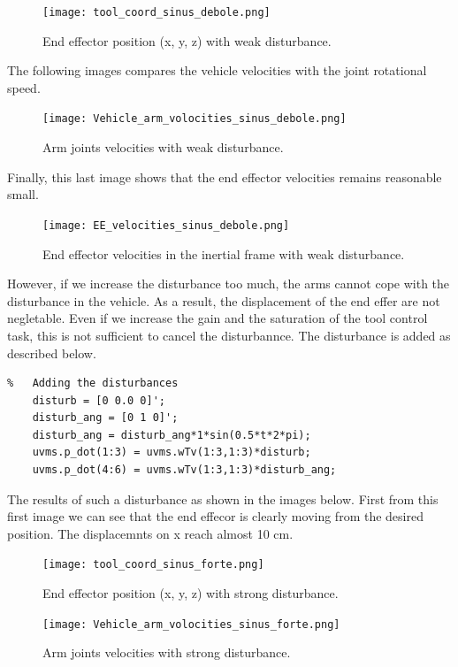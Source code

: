 \documentclass{article}
\begin{document}
\begin{figure}[H]
	\centering
	{\texttt{[image: tool\_coord\_sinus\_debole.png]}}
	\caption{End effector position (x, y, z) with weak disturbance.}
	\label{im:tool_cord2}
\end{figure}

The following images compares the vehicle velocities with the joint rotational speed.  \\ 


\begin{figure}[H]
	\centering
	{\texttt{[image: Vehicle\_arm\_volocities\_sinus\_debole.png]}}
	\caption{Arm joints velocities with weak disturbance.}
	\label{im:arm_vel2}
\end{figure}


Finally, this last image shows that the end effector velocities remains reasonable small.  \\ 


\begin{figure}[H]
	\centering
	{\texttt{[image: EE\_velocities\_sinus\_debole.png]}}
	\caption{End effector velocities in the inertial frame with weak disturbance.}
	\label{im:tool_vel2}
\end{figure}

 
However, if we increase the disturbance too much, the arms cannot cope with the disturbance in the vehicle. As a result, the displacement of the end effer are not negletable. Even if we increase the gain and the saturation of the tool control task, this is not sufficient to cancel the disturbannce.  The disturbance is added as described below.
\begin{lstlisting}
%	Adding the disturbances
    disturb = [0 0.0 0]';
    disturb_ang = [0 1 0]';
    disturb_ang = disturb_ang*1*sin(0.5*t*2*pi);
    uvms.p_dot(1:3) = uvms.wTv(1:3,1:3)*disturb;
    uvms.p_dot(4:6) = uvms.wTv(1:3,1:3)*disturb_ang;
\end{lstlisting}
The results of such a disturbance as shown in the images below.
First from this first image we can see that the end effecor is clearly moving from the 
desired position. The displacemnts on x reach almost 10 cm.  \\

\begin{figure}[H]
	\centering
	{\texttt{[image: tool\_coord\_sinus\_forte.png]}}
	\caption{End effector position (x, y, z) with strong disturbance.}
	\label{im:tool_cord3}
\end{figure}

\begin{figure}[H]
	\centering
	{\texttt{[image: Vehicle\_arm\_volocities\_sinus\_forte.png]}}
	\caption{Arm joints velocities with strong disturbance.}
	\label{im:arm_vel3}
\end{figure}
\end{document}
